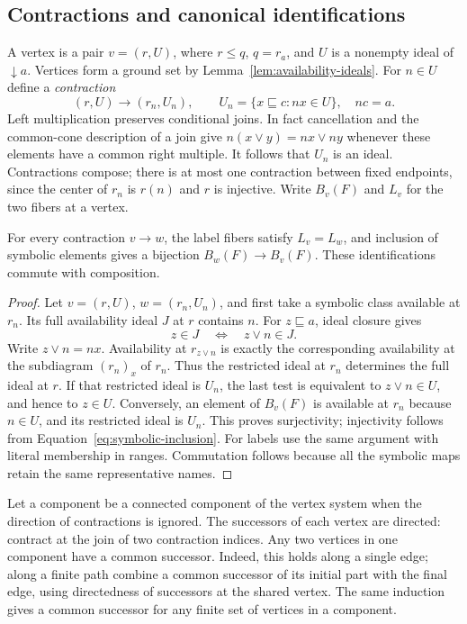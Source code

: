 \subsection{Contractions and canonical identifications}

A vertex is a pair $v=(r,U)$, where $r\le q$, $q=r_a$, and $U$ is a
nonempty ideal of $\downarrow a$. Vertices form a ground set by
Lemma~\ref{lem:availability-ideals}. For $n\in U$ define a
\emph{contraction}
\begin{equation}\label{eq:quotient-contraction}
 (r,U)\longrightarrow(r_n,U_n),\qquad
 U_n=\{x\sqsubseteq c:nx\in U\},\quad nc=a.
\end{equation}
Left multiplication preserves conditional joins. In fact cancellation
and the common-cone description of a join give
$n(x\vee y)=nx\vee ny$ whenever these elements have a common right
multiple. It follows that $U_n$ is an ideal. Contractions compose;
there is at most one contraction between fixed endpoints, since the
center of $r_n$ is $r(n)$ and $r$ is injective. Write $B_v(F)$ and
$L_v$ for the two fibers at a vertex.

\begin{lemma}\label{lem:contraction-fibers}
For every contraction $v\to w$, the label fibers satisfy $L_v=L_w$,
and inclusion of symbolic elements gives a bijection
$B_w(F)\longrightarrow B_v(F)$. These identifications commute with
composition.
\end{lemma}
\begin{proof}
Let $v=(r,U)$, $w=(r_n,U_n)$, and first take a symbolic class
available at $r_n$. Its full availability ideal $J$ at $r$ contains
$n$. For $z\sqsubseteq a$, ideal closure gives
\[
 z\in J\quad\Longleftrightarrow\quad z\vee n\in J.
\]
Write $z\vee n=nx$. Availability at $r_{z\vee n}$ is exactly the
corresponding availability at the subdiagram $(r_n)_x$ of $r_n$.
Thus the restricted ideal at $r_n$ determines the full ideal at $r$.
If that restricted ideal is $U_n$, the last test is equivalent to
$z\vee n\in U$, and hence to $z\in U$. Conversely, an element of
$B_v(F)$ is available at $r_n$ because $n\in U$, and its restricted
ideal is $U_n$. This proves surjectivity; injectivity follows from
Equation~\eqref{eq:symbolic-inclusion}. For labels use the same
argument with literal membership in ranges. Commutation follows
because all the symbolic maps retain the same representative names.
\end{proof}

Let a component be a connected component of the vertex system when
the direction of contractions is ignored. The successors of each
vertex are directed: contract at the join of two contraction indices.
Any two vertices in one component have a common successor. Indeed,
this holds along a single edge; along a finite path combine a common
successor of its initial part with the final edge, using directedness
of successors at the shared vertex. The same induction gives a common
successor for any finite set of vertices in a component.

